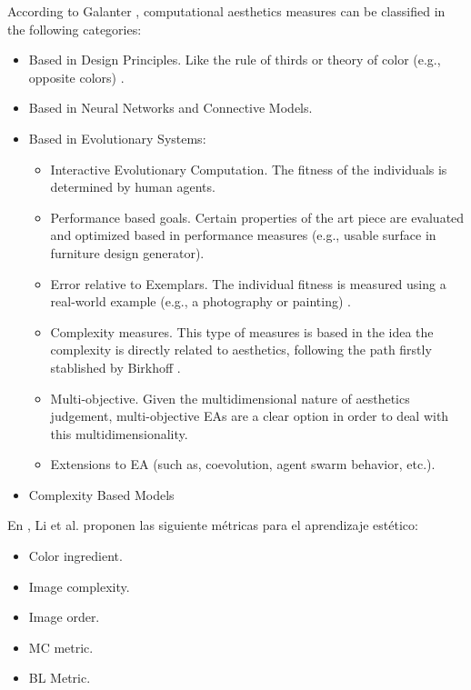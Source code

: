\documentclass[conference]{IEEEtran}
\begin{document}
According to Galanter \cite{galanter2012computational}, computational aesthetics measures can be classified in the following categories:
\begin{itemize}
	\item Based in Design Principles. Like the rule of thirds or theory of color (e.g., opposite colors) \cite{den2012evolving}.
	\item Based in Neural Networks and Connective Models. 
	\item Based in Evolutionary Systems:
		\begin{itemize}
			\item Interactive Evolutionary Computation. The fitness of the individuals is determined by human agents.
			\item Performance based goals. Certain properties of the art piece are evaluated and optimized based in performance measures (e.g., usable surface in furniture design generator). %
			\item Error relative to Exemplars. The individual fitness is measured using a real-world example (e.g., a photography or painting) \cite{dipaola2009incorporating}.
			\item Complexity measures. This type of measures is based in the idea the complexity is directly related to aesthetics, following the path firstly stablished by Birkhoff \cite{Birkhoff:1933fk}.
			\item Multi-objective. Given the multidimensional nature of aesthetics judgement, multi-objective EAs are a clear option in order to deal with this multidimensionality.
			\item Extensions to EA (such as, coevolution, agent swarm behavior, etc.).
		\end{itemize}
	\item Complexity Based Models
\end{itemize}

En \cite{li2012investigating}, Li et al. proponen las siguiente métricas para el aprendizaje estético:
\begin{itemize}
	\item Color ingredient.
	\item Image complexity.
	\item Image order.
	\item MC metric.
	\item BL Metric.
\end{itemize}
\end{document}
